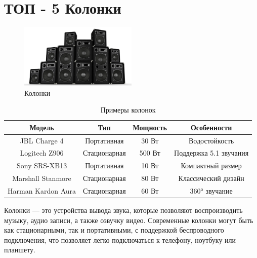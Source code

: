 \documentclass[14pt]{extreport}
\begin{document}
    \section{ТОП - 5 Колонки}
    \begin{figure}[h]
        \centering
        \includegraphics[width=0.5\textwidth]{kolonki.png}
        \caption{Колонки}
        \label{fig:example1}
    \end{figure}
        \begin{table}[h]
        \centering
        \begin{tabular}{|c|c|c|c|}
            \hline
            Модель & Тип & Мощность & Особенности \\
            \hline
            JBL Charge 4 & Портативная & 30 Вт & Водостойкость \\
            \hline
            Logitech Z906 & Стационарная & 500 Вт & Поддержка 5.1 звучания \\
            \hline
            Sony SRS-XB13 & Портативная & 10 Вт & Компактный размер \\
            \hline
            Marshall Stanmore & Стационарная & 80 Вт & Классический дизайн \\
            \hline
            Harman Kardon Aura & Стационарная & 60 Вт & 360° звучание \\
            \hline
        \end{tabular}
        \caption{Примеры колонок}
        \label{tab:example}
    \end{table}
    Колонки — это устройства вывода звука, которые позволяют воспроизводить музыку, аудио записи, а также озвучку видео. Современные колонки могут быть как стационарными, так и портативными, с поддержкой беспроводного подключения, что позволяет легко подключаться к телефону, ноутбуку или планшету.
\end{document}
